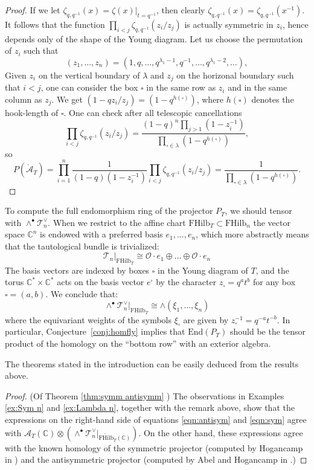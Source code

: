\documentclass[12pt]{amsart}
\numberwithin{equation}{section}
\theoremstyle{definition}
\theoremstyle{remark}
\newcommand{\CC}{\mathbb{C}}
\newcommand{\CA}{\mathcal{A}}
\newcommand{\CO}{\mathcal{O}}
\newcommand{\CT}{\mathcal{T}}
\renewcommand{\1}{\mathbf{1}}
\newcommand{\End}{\mathrm{End}}
\newcommand{\FH}{\mathrm{FHilb}}
\newcommand{\oFH}{\mathring{\FH}}
\newcommand{\torus}{\CC^{*} \times \CC^*}
\newcommand{\sq}{\square}
\newcommand{\oCA}{\mathring{\CA}}
\begin{document}
\begin{proof}
If we let  $\zeta_{q,q^{-1}}(x) = \zeta(x)|_{t=q^{-1}}$, then clearly
$
\zeta_{q,q^{-1}}(x)=\zeta_{q,q^{-1}}(x^{-1}).
$
It follows that the  function $\prod_{i<j}\zeta_{q,q^{-1}}(z_i/z_j)$
is actually symmetric in $z_i$, hence depends only of the shape of the Young diagram.
Let us choose the permutation of $z_i$ such that
$$
(z_1,\ldots,z_n)=(1,q,\ldots,q^{\lambda_1-1},q^{-1},\ldots,q^{\lambda_1-2},\ldots),
$$
Given $z_i$ on the vertical boundary of $\lambda$ and $z_j$ on the horizonal boundary such that $i<j$,
one can consider the box $\square$ in the same row as $z_i$ and in the same column as $z_j$. 
We get $(1-qz_i/z_j)=(1-q^{h(\square)})$, where $h(\square)$ denotes the hook-length of $\square$.
One can check after all telescopic cancellations 
$$
\prod_{i<j}\zeta_{q,q^{-1}}(z_i/z_j)=\frac{(1-q)^n\prod_{j>1}(1-z_i^{-1})}{\prod_{\square\in \lambda}(1-q^{h(\square)})},
$$
so
$$
P(\oCA_T)=\prod_{i=1}^{n}\frac{1}{(1-q)(1-z_i^{-1})}\prod_{i<j}\zeta_{q,q^{-1}}(z_i/z_j)=\frac{1}{\prod_{\square\in \lambda}(1-q^{h(\square)})}.
$$
\end{proof}

To compute the full endomorphism ring %
of the projector \(P_T\), we should tensor with $\wedge^{\bullet}\CT_n^{\vee}$.  
When we restrict to the affine chart $\FH_T \subset \FH_n$  the vector space $\CC^n$ is endowed with a preferred basis $e_1,...,e_n$, which more abstractly means that the tautological bundle is trivialized:
$$
\CT_n|_{\FH_T} \cong \CO \cdot e_1 \oplus...\oplus \CO \cdot e_n
$$
The basis vectors are indexed by boxes $\sq$ in the Young diagram of $T$, and the torus $\torus$ acts on the basis vector $e^\sq$ by the character $z_\sq = q^at^b$ for any box $\sq = (a,b)$. We conclude that:
$$
\wedge^{\bullet}\CT_n^{\vee}|_{\FH_T} \cong \wedge(\xi_1,\ldots,\xi_n)
$$
where the equivariant weights of the symbols $\xi_\sq$ are given by $z_\sq^{-1} = q^{-a}t^{-b}$. In particular, Conjecture~\ref{conj:homfly} implies that $\End(P_T)$ should be  the tensor product of the homology on the ``bottom row'' with an exterior algebra. 

The theorems stated in the introduction can be easily deduced from the results above.


\begin{proof} (Of Theorem \ref{thm:symm antisymm} ) The observations in Examples \ref{ex:Sym n} and \ref{ex:Lambda n}, together with the remark above, show that  the expressions on the right-hand side of equations 
\eqref{eqn:antisym} and \eqref{eqn:sym} agree with 
\( \CA_T(\CC) \otimes \left( \wedge^{\bullet}\CT_n^{\vee}|_{\oFH_T(\CC)} \right)\). 
On the other hand, these expressions agree with the known homology of the symmetric projector (computed by Hogancamp in \cite{Hog}) and the antisymmetric projector (computed by Abel and Hogancamp in \cite{AbHog}.) 
\end{proof}
\end{document}
